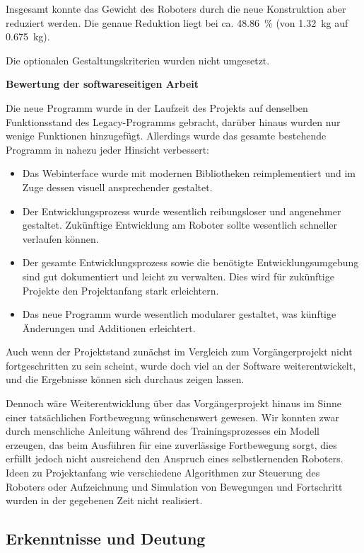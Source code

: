 Insgesamt konnte das Gewicht des Roboters durch die neue Konstruktion aber reduziert werden. Die genaue Reduktion liegt bei ca. \qty{48,86}{\percent} (von \qty{1,32}{\kilo\gram} auf \qty{0,675}{\kilo\gram}).

Die optionalen Gestaltungskriterien wurden nicht umgesetzt. 

\pagebreak
\textbf{Bewertung der softwareseitigen Arbeit}

Die neue Programm wurde in der Laufzeit des Projekts auf denselben Funktionsstand des Legacy-Programms gebracht, darüber hinaus wurden nur wenige Funktionen hinzugefügt. Allerdings wurde das gesamte bestehende Programm in nahezu jeder Hinsicht verbessert:

\begin{itemize}
	\item Das Webinterface wurde mit modernen Bibliotheken reimplementiert und im Zuge dessen visuell ansprechender gestaltet.
	\item Der Entwicklungsprozess wurde wesentlich reibungsloser und angenehmer gestaltet. Zukünftige Entwicklung am Roboter sollte wesentlich schneller verlaufen können.
	\item Der gesamte Entwicklungsprozess sowie die benötigte Entwicklungsumgebung sind gut dokumentiert und leicht zu verwalten. Dies wird für zukünftige Projekte den Projektanfang stark erleichtern.
	\item Das neue Programm wurde wesentlich modularer gestaltet, was künftige Änderung\-en und Additionen erleichtert.
\end{itemize}

Auch wenn der Projektstand zunächst im Vergleich zum Vorgängerprojekt nicht fortgeschritten zu sein scheint, wurde doch viel an der Software weiterentwickelt, und die Ergebnisse können sich durchaus zeigen lassen.

Dennoch wäre Weiterentwicklung über das Vorgängerprojekt hinaus im Sinne einer tatsächlichen Fortbewegung wünschenswert gewesen. Wir konnten zwar durch menschliche Anleitung während des Trainingsprozesses ein Modell erzeugen, das beim Aus\-führen für eine zuverlässige Fortbewegung sorgt, dies erfüllt jedoch nicht ausreichend den Anspruch eines selbstlernenden Roboters. Ideen zu Projektanfang wie verschiedene Algorithmen zur Steuerung des Roboters oder Aufzeichnung und Simulation von Bewegungen und Fortschritt wurden in der gegebenen Zeit nicht realisiert.

\subsection{Erkenntnisse und Deutung}

